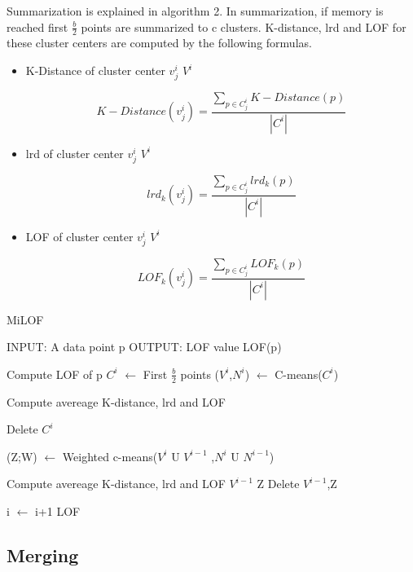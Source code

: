 \par 
Summarization  is explained in algorithm 2.
In summarization, if memory is reached first $\frac{b}{2}$ points are summarized to c clusters. K-distance, lrd and LOF for these cluster centers are computed by the following formulas.  

\begin{itemize}
	\item K-Distance of cluster center $v^i_j$ \in $V^i$ 
	
	
		\[  K-Distance(v^i_j) = \frac{\sum_{p \in C^i_j } K-Distance(p)}{| C^i |} \]
		
		
	 \item lrd of cluster center $v^i_j$ \in $V^i$ 
		
		
		\[  lrd_k(v^i_j) = \frac{\sum_{p \in C^i_j } lrd_k(p)}{| C^i |} \]
		
		\item LOF of cluster center $v^i_j$ \in $V^i$ 
		
		
		\[  LOF_k(v^i_j) = \frac{\sum_{p \in C^i_j } LOF_k(p)}{| C^i |} \]
	
\end{itemize}


\begin{algorithm}[h!]
	\caption{MiLOF}
	\begin{algorithmic}
		\STATE  
		\STATE INPUT:  A data point p 
		\STATE OUTPUT: LOF value LOF(p)
		\STATE
		
		\STATE Compute LOF of p 
			\STATE $C^i$ $\leftarrow$ First $\frac{b}{2}$ points
			\STATE ($V^i$,$N^i$) $\leftarrow$ C-means($C^i$)
			
			  \STATE Compute avereage K-distance, lrd and LOF
			\ENDFOR
			
			\STATE Delete $C^i$
			
				\STATE (Z;W) $\leftarrow$ Weighted c-means($V^i$ U $V^{i-1}$ ,$N^i$ U $N^{i-1}$)
				
					\STATE Compute avereage K-distance, lrd and LOF
				\ENDFOR 
				\STATE $V^{i-1}$ \leftarrow Z
				\STATE Delete $V^{i-1}$,Z
				
			\ENDIF	
		\ENDIF
		
		\STATE i $\leftarrow$ i+1
		\RETURN LOF
	\end{algorithmic}
\end{algorithm}

\subsection{Merging}

